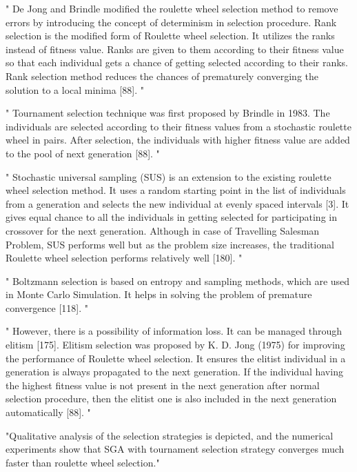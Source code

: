 "
De Jong and Brindle modified the roulette wheel selection method to remove errors by introducing the concept of determinism in selection procedure. Rank selection is the modified form of Roulette wheel selection. It utilizes the ranks instead of fitness value. Ranks are given to them according to their fitness value so that each individual gets a chance of getting selected according to their ranks. Rank selection method reduces the chances of prematurely converging the solution to a local minima [88].
"\cite{katoch_review_2021}


"
Tournament selection technique was first proposed by Brindle in 1983. The individuals are selected according to their fitness values from a stochastic roulette wheel in pairs. After selection, the individuals with higher fitness value are added to the pool of next generation [88].
"\cite{katoch_review_2021}


"
Stochastic universal sampling (SUS) is an extension to the existing roulette wheel selection method. It uses a random starting point in the list of individuals from a generation and selects the new individual at evenly spaced intervals [3]. It gives equal chance to all the individuals in getting selected for participating in crossover for the next generation. Although in case of Travelling Salesman Problem, SUS performs well but as the problem size increases, the traditional Roulette wheel selection performs relatively well [180].
"\cite{katoch_review_2021}

"
Boltzmann selection is based on entropy and sampling methods, which are used in Monte Carlo Simulation. It helps in solving the problem of premature convergence [118].
"\cite{katoch_review_2021}


"
However, there is a possibility of information loss. It can be managed through elitism [175]. Elitism selection was proposed by K. D. Jong (1975) for improving the performance of Roulette wheel selection. It ensures the elitist individual in a generation is always propagated to the next generation. If the individual having the highest fitness value is not present in the next generation after normal selection procedure, then the elitist one is also included in the next generation automatically [88].
"\cite{katoch_review_2021}


"Qualitative analysis of the selection strategies is depicted, and the numerical experiments show that SGA with tournament selection strategy converges much faster than roulette wheel selection."
\cite{jinghui_zhong_comparison_2005}

